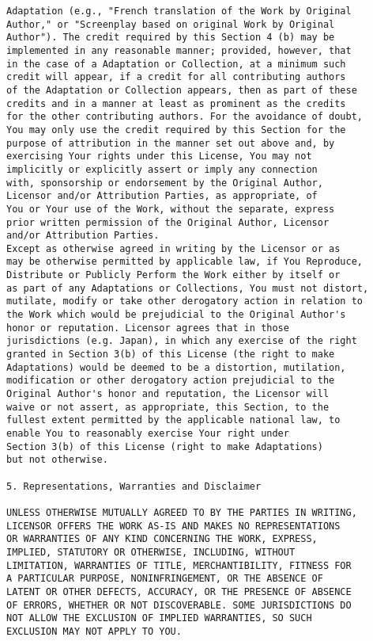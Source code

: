 \begin{verbatim}
Adaptation (e.g., "French translation of the Work by Original
Author," or "Screenplay based on original Work by Original
Author"). The credit required by this Section 4 (b) may be
implemented in any reasonable manner; provided, however, that
in the case of a Adaptation or Collection, at a minimum such
credit will appear, if a credit for all contributing authors
of the Adaptation or Collection appears, then as part of these
credits and in a manner at least as prominent as the credits
for the other contributing authors. For the avoidance of doubt,
You may only use the credit required by this Section for the
purpose of attribution in the manner set out above and, by
exercising Your rights under this License, You may not
implicitly or explicitly assert or imply any connection
with, sponsorship or endorsement by the Original Author,
Licensor and/or Attribution Parties, as appropriate, of
You or Your use of the Work, without the separate, express
prior written permission of the Original Author, Licensor
and/or Attribution Parties.
Except as otherwise agreed in writing by the Licensor or as
may be otherwise permitted by applicable law, if You Reproduce,
Distribute or Publicly Perform the Work either by itself or
as part of any Adaptations or Collections, You must not distort,
mutilate, modify or take other derogatory action in relation to
the Work which would be prejudicial to the Original Author's
honor or reputation. Licensor agrees that in those
jurisdictions (e.g. Japan), in which any exercise of the right
granted in Section 3(b) of this License (the right to make
Adaptations) would be deemed to be a distortion, mutilation,
modification or other derogatory action prejudicial to the
Original Author's honor and reputation, the Licensor will
waive or not assert, as appropriate, this Section, to the
fullest extent permitted by the applicable national law, to
enable You to reasonably exercise Your right under
Section 3(b) of this License (right to make Adaptations)
but not otherwise.

5. Representations, Warranties and Disclaimer

UNLESS OTHERWISE MUTUALLY AGREED TO BY THE PARTIES IN WRITING,
LICENSOR OFFERS THE WORK AS-IS AND MAKES NO REPRESENTATIONS
OR WARRANTIES OF ANY KIND CONCERNING THE WORK, EXPRESS,
IMPLIED, STATUTORY OR OTHERWISE, INCLUDING, WITHOUT
LIMITATION, WARRANTIES OF TITLE, MERCHANTIBILITY, FITNESS FOR
A PARTICULAR PURPOSE, NONINFRINGEMENT, OR THE ABSENCE OF
LATENT OR OTHER DEFECTS, ACCURACY, OR THE PRESENCE OF ABSENCE
OF ERRORS, WHETHER OR NOT DISCOVERABLE. SOME JURISDICTIONS DO
NOT ALLOW THE EXCLUSION OF IMPLIED WARRANTIES, SO SUCH
EXCLUSION MAY NOT APPLY TO YOU.


\end{verbatim}
